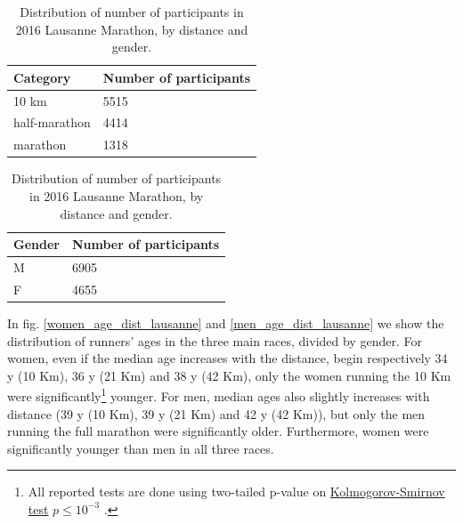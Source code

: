 \documentclass[fleqn,10pt]{wlscirep}
\begin{document}

	 	\begin{table}
	 		\centering
	 		\begin{tabular}[t]{l|l}
	 			Category     & Number of participants \\ \hline
	 			10 km         & 5515                   \\
	 			half-marathon & 4414                   \\
	 			marathon      & 1318                   \\
	 		\end{tabular}
 			\hfill
 			\begin{tabular}[t]{l|l}
				Gender     		& Number of participants \\ \hline
 				M       	  & 6905 					\\
				F		 		& 4655                   \\
 			\end{tabular}
 		\caption{Distribution of number of participants in 2016 Lausanne Marathon, by distance and gender.}
 		\label{counts_per_distance}
	 	\end{table}
 	
 		In fig. \ref{women_age_dist_lausanne} and \ref{men_age_dist_lausanne} we show the distribution of runners' ages in the three main races, divided by gender.
 		For women, even if the median age increases with the distance, begin respectively 
 		34 y (10 Km),
 		36 y (21 Km) and
 		38 y (42 Km),
 		only the women running the 10 Km were 
 		significantly\footnote{All reported tests are done using two-tailed p-value on \href{https://en.wikipedia.org/wiki/Kolmogorov–Smirnov\_test\#Two-sample\_Kolmogorov.E2.80.93Smirnov_test}{Kolmogorov-Smirnov test} $ p \leq 10^{-3} $ .} 
 		younger.
 		For men, median ages also slightly increases with distance
 		(39 y (10 Km),
 		39 y (21 Km) and
 		42 y (42 Km)),
 		but only the men running the full marathon were significantly older.
 		Furthermore, women were significantly younger than men in all three races.
 		
\end{document}
